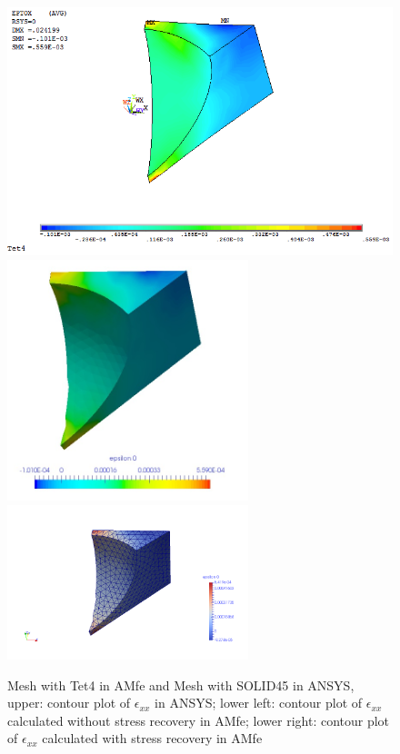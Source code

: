 \begin{figure}[htbp]
	\begin{center}
		\includegraphics[width=13cm,clip]{Tet4Exx.png} 	
		\includegraphics[width=7cm,clip]{Tet4ExxPD.png} 			
		\includegraphics[width=7cm,clip]{Tet4ExxP.png} 		
		\caption{Mesh with Tet4 in AMfe and Mesh with SOLID45 in ANSYS, upper: contour plot of $\epsilon_{xx}$ in ANSYS; lower left: contour plot of $\epsilon_{xx}$ calculated without stress recovery in AMfe; lower right: contour plot of $\epsilon_{xx}$ calculated with stress recovery in AMfe} \label{fig: Tet4_Exx}
	\end{center}
\end{figure}
\clearpage 

